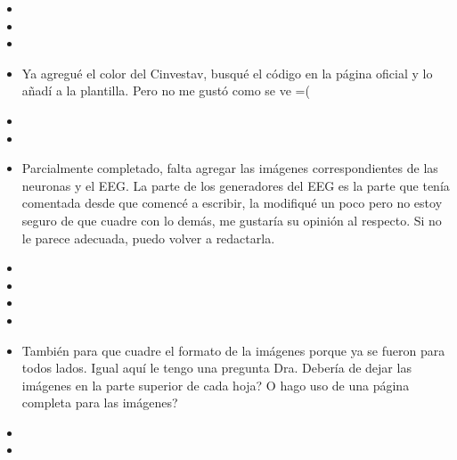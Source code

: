 %



\begin{itemize}
	\item {} 
	\item {}
	\item {}
	\item {} Ya agregué el color del Cinvestav, busqué el código en la página oficial y lo añadí a la plantilla. Pero no me gustó como se ve =(
	\item {}
	\item {}
	\item {} Parcialmente completado, falta agregar las imágenes correspondientes de las neuronas y el EEG. La parte de los generadores del EEG es la parte que tenía comentada desde que comencé a escribir, la modifiqué un poco pero no estoy seguro de que cuadre con lo demás, me gustaría su opinión al respecto. Si no le parece adecuada, puedo volver a redactarla.
	\item {}
	\item {}
	\item {}
	\item {}
	\item {} También para que cuadre el formato de la imágenes porque ya se fueron para todos lados. Igual aquí le tengo una pregunta Dra. Debería de dejar las imágenes en la parte superior de cada hoja? O hago uso de una página completa para las imágenes?
	\item {}
	\item {}
\end{itemize}
